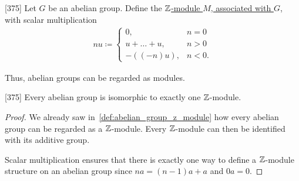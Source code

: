 \begin{definition}\label{def:abelian_group_z_module}\cite{Knapp2016BAlg}[375]
  Let $G$ be an abelian group. Define the \uline{$\mathbb Z$-module $M$, associated with $G$}, with scalar multiplication
  \begin{align*}
    nu \coloneqq \begin{cases}
      0, &n = 0 \\
      u + \ldots + u, &n > 0 \\
      -((-n)u), &n < 0.
    \end{cases}
  \end{align*}

  Thus, abelian groups can be regarded as modules.
\end{definition}

\begin{theorem}\label{thm:abelian_group_iff_z_module}\cite{Knapp2016BAlg}[375]
  Every abelian group is isomorphic to exactly one $\mathbb Z$-module.
\end{theorem}
\begin{proof}
  We already saw in~\cref{def:abelian_group_z_module} how every abelian group can be regarded as a $\mathbb Z$-module. Every $\mathbb Z$-module can then be identified with its additive group.

  Scalar multiplication ensures that there is exactly one way to define a $\mathbb Z$-module structure on an abelian group since $na = (n-1)a + a$ and $0a = 0$.
\end{proof}
